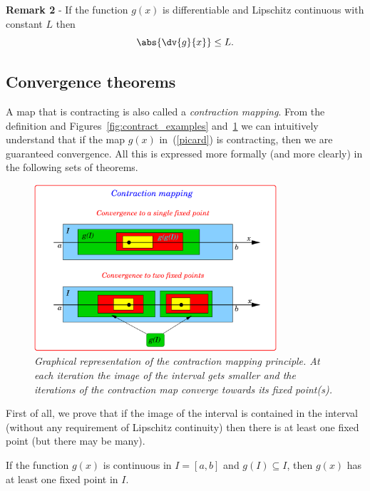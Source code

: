\noindent
\textbf{Remark 2} - If the function $g(x)$ is differentiable and
Lipschitz continuous with constant $L$ then
%
\begin{equation*}
   \abs{\dv{g}{x}}  \le L.
\end{equation*}

\subsection{Convergence theorems}

A map that is contracting is also called a \textit{contraction
mapping}.  From the definition and Figures~\ref{fig:contract_examples}
and~\ref{fig:contraction} we can intuitively understand that if
the map $g(x)$ in~(\ref{picard}) is contracting, then we are
guaranteed convergence.  All this is expressed more
formally (and more clearly) in the following sets of theorems.

\begin{figure}
  \centerline{\includegraphics[width=90mm]{figures/contraction_col}}
  \caption{\label{fig:contraction} \it Graphical representation of the
    contraction mapping principle.  At each iteration the image of the
    interval gets smaller and the iterations of the contraction map
    converge towards its fixed point(s).}
\end{figure}

First of all, we prove that if the image of  the interval is contained
in the interval (without any requirement of Lipschitz continuity) then
there is at least one fixed point (but there may be many).

\smallskip

\begin{theorem}
\label{contract1}
If the function $g(x)$ is continuous in $I=[a,b]$ and $g(I) \subseteq
I$, then $g(x)$ has at least one fixed point in $I$.
\end{theorem}

